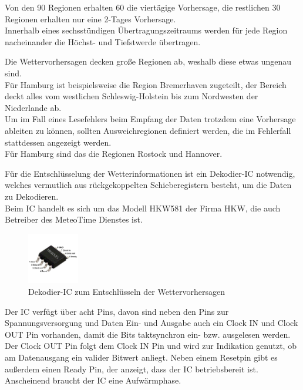 \documentclass[a4paper,11pt]{article}
\begin{document}
\vspace{0.2cm}
\noindent
Von den 90 Regionen erhalten 60 die viertägige Vorhersage, die restlichen 30 Regionen erhalten nur eine 2-Tages Vorhersage. \\
Innerhalb eines sechsstündigen Übertragungszeitraums werden für jede Region nacheinander die Höchst- und Tiefstwerde übertragen.

\noindent
Die Wettervorhersagen decken große Regionen ab, weshalb diese etwas ungenau sind. \\
Für Hamburg ist beispielsweise die Region Bremerhaven zugeteilt, der Bereich deckt alles vom westlichen Schleswig-Holstein bis zum Nordwesten der Niederlande ab. \\
Um im Fall eines Lesefehlers beim Empfang der Daten trotzdem eine Vorhersage ableiten zu können, sollten Ausweichregionen definiert werden, die im Fehlerfall stattdessen angezeigt werden. \\
Für Hamburg sind das die Regionen Rostock und Hannover. 

\vspace{0.3cm}
\noindent
Für die Entschlüsselung der Wetterinformationen ist ein Dekodier-IC notwendig, welches vermutlich aus rückgekoppelten Schieberegistern besteht, um die Daten zu Dekodieren. \\
Beim IC handelt es sich um das Modell HKW581 der Firma HKW, die auch Betreiber des MeteoTime Dienstes ist. 

\begin{figure}[H]
  \centering
  \includegraphics[width = 0.2\textwidth]{HKW5811}
  \caption{Dekodier-IC zum Entschlüsseln der Wettervorhersagen}
  \label{fig:hkw581}
\end{figure}

\noindent
Der IC verfügt über acht Pins, davon sind neben den Pins zur Spannungsversorgung und Daten Ein- und Ausgabe auch ein Clock IN und Clock OUT Pin vorhanden, damit die Bits
taktsynchron ein- bzw. ausgelesen werden. Der Clock OUT Pin folgt dem Clock IN Pin und wird zur Indikation genutzt, ob am Datenausgang ein valider Bitwert anliegt. 
Neben einem Resetpin gibt es außerdem einen Ready Pin, der anzeigt, dass der IC betriebsbereit ist. Anscheinend braucht der IC eine Aufwärmphase. 
\end{document}
